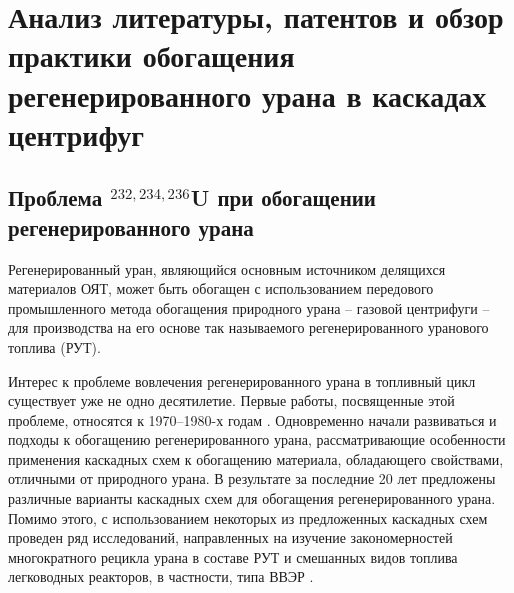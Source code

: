 \chapter{Анализ литературы, патентов и обзор практики обогащения регенерированного урана в каскадах центрифуг}\label{ch1}


\section{Проблема $^{232,234,236}$U при обогащении регенерированного урана}

Регенерированный уран, являющийся основным источником делящихся материалов ОЯТ, может быть обогащен с использованием передового промышленного метода обогащения природного урана -- газовой центрифуги -- для производства на его основе так называемого регенерированного уранового топлива (РУТ).

Интерес к проблеме вовлечения регенерированного урана в топливный цикл существует уже не одно десятилетие. Первые работы, посвященные этой проблеме, относятся к 1970–1980-х годам \cite{kazukihidaSimultaneousEvaluationEffects1986,sidenkoIssledovanieKaskadnyhShem,psheninZaklyuchitelnyyOtchetNIR2012,delagarzaUranium236LightWater1977,raysIzgotovlenieOksidnogoTopliva1994,zhiroEkonomicheskiePreimushchestvaPererabotki1997,lebedevZamknutyyToplivnyyCikl1999}. Одновременно начали развиваться и подходы к обогащению регенерированного урана, рассматривающие особенности применения каскадных схем к обогащению материала, обладающего свойствами, отличными от природного урана. В результате за последние 20 лет предложены различные варианты каскадных схем для обогащения регенерированного урана. Помимо этого, с использованием некоторых из предложенных каскадных схем проведен ряд исследований, направленных на изучение закономерностей многократного рецикла урана в составе РУТ и смешанных видов топлива легководных реакторов, в частности, типа ВВЭР \cite{smirnovEvolutionIsotopicComposition2012,kazukihidaSimultaneousEvaluationEffects1986,blandinskiySoglasovannyyPodhodModelirovaniyu2018,colemanEvaluationMultipleSelfrecycling2010}. 

